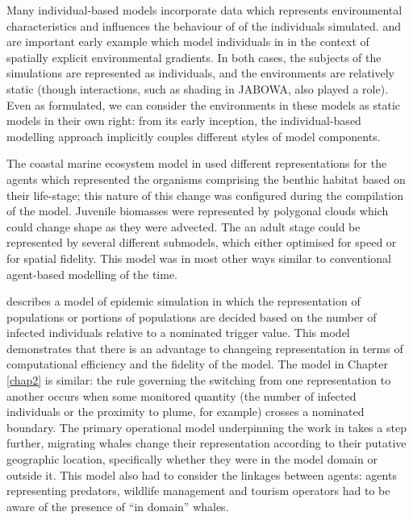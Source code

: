 {Many individual-based models incorporate data which represents
environmental characteristics and influences the behaviour of of the
individuals simulated. \cite{Botkin72:2} and \cite{deangelis1978model}
are important early example which model individuals in in the context
of spatially explicit environmental gradients. \cite{Botkin72:2} In
both cases, the subjects of the simulations are represented as
individuals, and the environments are relatively static (though
interactions, such as shading in JABOWA, also played a role).  Even as
formulated, we can consider the environments in these models as static
models in their own right: from its early inception, the
individual-based modelling approach implicitly couples different
styles of model components.

The coastal marine ecosystem model in \cite{Gray06:1} used different
representations for the agents which represented the organisms
comprising the benthic habitat based on their life-stage; this nature
of this change was configured during the compilation of the model.
Juvenile biomasses were represented by polygonal clouds which could
change shape as they were advected. The an adult stage could be
represented by several different submodels, which either optimised for
speed or for spatial fidelity.  This model was in most other ways
similar to conventional agent-based modelling of the time.


\cite{Bobashev2007hybrid} describes a model of epidemic simulation in
which the representation of populations or portions of populations are
decided based on the number of infected individuals relative to a
nominated trigger value. This model demonstrates that there is an
advantage to changeing representation in terms of computational
efficiency and the fidelity of the model. The model in Chapter
\ref{chap2} is similar: the rule governing the switching from one
representation to another occurs when some monitored quantity (the
number of infected individuals or the proximity to plume, for example)
crosses a nominated boundary.  The primary operational model
underpinning the work in \cite{Fulton2009crossingscales} takes a step
further, migrating whales change their representation according to
their putative geographic location, specifically whether they were in
the model domain or outside it. This model also had to consider
the linkages between agents: agents representing predators, wildlife
management and tourism operators had to be aware of the presence of
``in domain'' whales.


}
